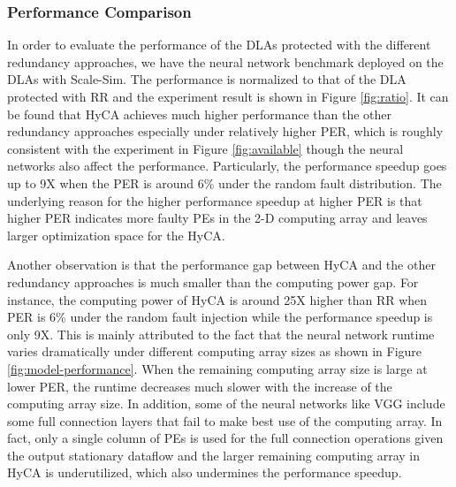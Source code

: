 \subsubsection{Performance Comparison}
In order to evaluate the performance of the DLAs protected with the different redundancy approaches, we have the neural network benchmark deployed on the DLAs with Scale-Sim. The performance is normalized to that of the DLA protected with RR and the experiment result is shown in Figure \ref{fig:ratio}. It can be found that HyCA achieves much higher performance than the other redundancy approaches especially under relatively higher PER, which is roughly consistent with the experiment in Figure \ref{fig:available} though the neural networks also affect the performance. Particularly, the performance speedup goes up to 9X when the PER is around 6\% under the random fault distribution. The underlying reason for the higher performance speedup at higher PER is that higher PER indicates more faulty PEs in the 2-D computing array and leaves larger optimization space for the HyCA. 

Another observation is that the performance gap between HyCA and the other redundancy approaches is much smaller than the computing power gap. For instance, the computing power of HyCA is around 25X higher than RR when PER is 6\% under the random fault injection while the performance speedup is only 9X. This is mainly attributed to the fact that the neural network runtime varies dramatically under different computing array sizes as shown in Figure \ref{fig:model-performance}. When the remaining computing array size is large at lower PER, the runtime decreases much slower with the increase of the computing array size. In addition, some of the neural networks like VGG include some full connection layers that fail to make best use of the computing array. In fact, only a single column of PEs is used for the full connection operations given the output stationary dataflow and the larger remaining computing array in HyCA is underutilized, which also undermines the performance speedup.

